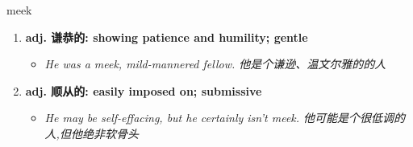 
\begin{frame}
{\huge meek}
\begin{center}
\begin{enumerate}\Large
  \item \textbf{adj. 谦恭的: showing patience and humility; gentle}
  \begin{itemize}
    \item \em{\Large{He was a meek, mild-mannered fellow. 他是个谦逊、温文尔雅的的人}}
  \end{itemize}
  \item \textbf{adj. 顺从的: easily imposed on; submissive}
  \begin{itemize}
    \item \em{\Large{He may be self-effacing, but he certainly isn't meek. 他可能是个很低调的人,但他绝非软骨头}}
  \end{itemize}
\end{enumerate}
\end{center}
\end{frame}

